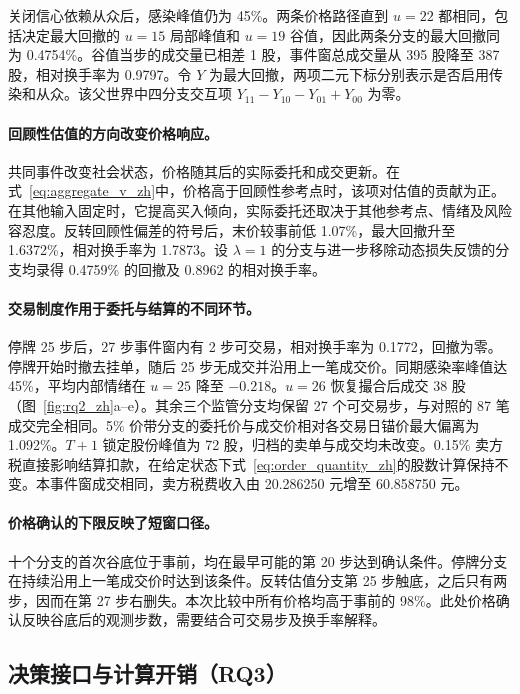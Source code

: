 关闭信心依赖从众后，感染峰值仍为 45\%。两条价格路径直到 $u=22$ 都相同，包括决定最大回撤的 $u=15$ 局部峰值和 $u=19$ 谷值，因此两条分支的最大回撤同为 0.4754\%。谷值当步的成交量已相差 1 股，事件窗总成交量从 395 股降至 387 股，相对换手率为 0.9797。令 $Y$ 为最大回撤，两项二元下标分别表示是否启用传染和从众。该父世界中四分支交互项 $Y_{11}-Y_{10}-Y_{01}+Y_{00}$ 为零。

\paragraph{回顾性估值的方向改变价格响应。}
共同事件改变社会状态，价格随其后的实际委托和成交更新。在式~\eqref{eq:aggregate_v_zh}中，价格高于回顾性参考点时，该项对估值的贡献为正。在其他输入固定时，它提高买入倾向，实际委托还取决于其他参考点、情绪及风险容忍度。反转回顾性偏差的符号后，末价较事前低 1.07\%，最大回撤升至 1.6372\%，相对换手率为 1.7873。设 $\lambda=1$ 的分支与进一步移除动态损失反馈的分支均录得 0.4759\% 的回撤及 0.8962 的相对换手率。

\paragraph{交易制度作用于委托与结算的不同环节。}
停牌 25 步后，27 步事件窗内有 2 步可交易，相对换手率为 0.1772，回撤为零。停牌开始时撤去挂单，随后 25 步无成交并沿用上一笔成交价。同期感染率峰值达 45\%，平均内部情绪在 $u=25$ 降至 $-0.218$。$u=26$ 恢复撮合后成交 38 股（图~\ref{fig:rq2_zh}a--e）。其余三个监管分支均保留 27 个可交易步，与对照的 87 笔成交完全相同。5\% 价带分支的委托价与成交价相对各交易日锚价最大偏离为 1.092\%。$T+1$ 锁定股份峰值为 72 股，归档的卖单与成交均未改变。0.15\% 卖方税直接影响结算扣款，在给定状态下式~\eqref{eq:order_quantity_zh}的股数计算保持不变。本事件窗成交相同，卖方税费收入由 20.286250 元增至 60.858750 元。

\paragraph{价格确认的下限反映了短窗口径。}
十个分支的首次谷底位于事前，均在最早可能的第 20 步达到确认条件。停牌分支在持续沿用上一笔成交价时达到该条件。反转估值分支第 25 步触底，之后只有两步，因而在第 27 步右删失。本次比较中所有价格均高于事前的 98\%。此处价格确认反映谷底后的观测步数，需要结合可交易步及换手率解释。

\subsection{决策接口与计算开销（RQ3）}
\label{sec:exp:rq3_zh}

